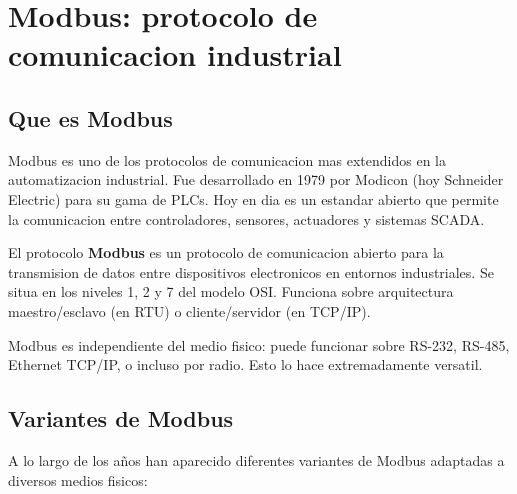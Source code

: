 \section{Modbus: protocolo de comunicacion industrial}

\subsection{Que es Modbus}

Modbus es uno de los protocolos de comunicacion mas extendidos en la
automatizacion industrial. Fue desarrollado en 1979 por Modicon (hoy Schneider
Electric) para su gama de PLCs. Hoy en dia es un estandar abierto que permite
la comunicacion entre controladores, sensores, actuadores y sistemas SCADA.

\begin{definicion}[Modbus]
El protocolo \textbf{Modbus} es un protocolo de comunicacion abierto para la
transmision de datos entre dispositivos electronicos en entornos industriales.
Se situa en los niveles 1, 2 y 7 del modelo OSI. Funciona sobre arquitectura
maestro/esclavo (en RTU) o cliente/servidor (en TCP/IP).
\end{definicion}

Modbus es independiente del medio fisico: puede funcionar sobre RS-232,
RS-485, Ethernet TCP/IP, o incluso por radio. Esto lo hace extremadamente
versatil.

\subsection{Variantes de Modbus}

A lo largo de los años han aparecido diferentes variantes de Modbus adaptadas a
diversos medios fisicos:

